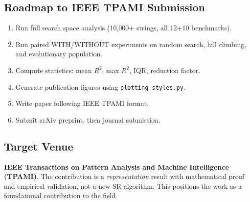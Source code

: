 \subsection{Roadmap to IEEE TPAMI Submission}

\begin{enumerate}[nosep]
  \item Run full search space analysis (10,000+ strings, all 12+10 benchmarks).
  \item Run paired WITH/WITHOUT experiments on random search, hill climbing,
    and evolutionary population.
  \item Compute statistics: mean $R^2$, max $R^2$, IQR, reduction factor.
  \item Generate publication figures using \texttt{plotting\_styles.py}.
  \item Write paper following IEEE TPAMI format.
  \item Submit arXiv preprint, then journal submission.
\end{enumerate}

\subsection{Target Venue}

\textbf{IEEE Transactions on Pattern Analysis and Machine Intelligence (TPAMI)}.
The contribution is a \textit{representation} result with mathematical proof
and empirical validation, not a new SR algorithm. This positions the work
as a foundational contribution to the field.

